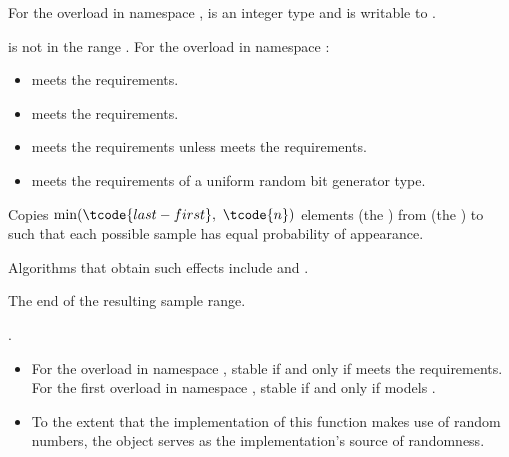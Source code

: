 \begin{itemdescr}
\pnum
\mandates
For the overload in namespace ,
 is an integer type and
 is writable to .

\pnum
\expects
{} is not in the range .
For the overload in namespace :
\begin{itemize}
\item
   meets
  the  requirements.
\item
   meets
  the  requirements.
\item
   meets
  the  requirements
  unless  meets
  the  requirements.
\item
   meets
  the requirements of a uniform random bit generator type.
\end{itemize}

\pnum
\effects
Copies $\min(\tcode{last - first}, \ \tcode{n})$ elements (the )
from  (the ) to 
such that each possible sample has equal probability of appearance.
\begin{note}
Algorithms that obtain such effects include 
and .
\end{note}

\pnum
\returns
The end of the resulting sample range.

\pnum
\complexity
{}.

\pnum
\remarks
\begin{itemize}
\item
  For the overload in namespace ,
  stable if and only if  meets
  the  requirements.
  For the first overload in namespace ,
  stable if and only if  models .
\item
  To the extent that the implementation of this function makes use
  of random numbers, the object  serves as
  the implementation's source of randomness.
\end{itemize}
\end{itemdescr}

